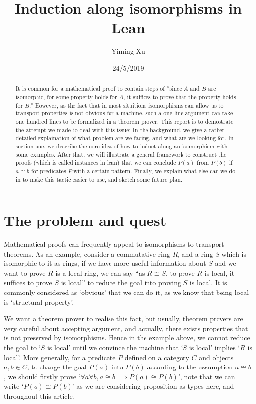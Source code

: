 \documentclass[11pt]{article}
\title{Induction along isomorphisms in Lean}
\author{Yiming Xu}
\date{24/5/2019}
\begin{document}
\maketitle
\begin{abstract}
    It is common for a mathematical proof to contain steps of ``since $A$ and $B$ are isomorphic, for some property holds for $A$, it suffices to prove that the property holds for $B$." However, as the fact that in most situitions isomorphisms can allow us to transport properties is not obvious for a machine, such a one-line argument can take one hundred lines to be formalized in a theorem prover. This report is to demostrate the attempt we made to deal with this issue: In the background, we give a rather detailed explaination of what problem are we facing, and what are we looking for. In section one, we describe the core idea of how to induct along an isomorphism with some examples. After that, we will illustrate a general framework to construct the proofs (which is called instances in lean) that we can conclude $P (a)$ from $P (b)$ if $a \cong b$ for predicates $P$ with a certain pattern. Finally, we explain what else can we do in to make this tactic easier to use, and sketch some future plan.
\end{abstract}
  

\section{The problem and quest}

Mathematical proofs can frequently appeal to isomorphisms to transport theorems. As an example, consider a commutative ring $R$, and a ring $S$ which is isomorphic to it as rings, if we have more useful information about $S$ and we want to prove $R$ is a local ring, we can say ``as $R\cong S$, to prove $R$ is local, it suffices to prove $S$ is local'' to reduce the goal into proving $S$ is local. It is commonly considered as `obvious' that we can do it, as we know that being local is `structural property'. 

We want a theorem prover to realise this fact, but usually, theorem provers are very careful about accepting argument, and actually, there exists properties that is not preserved by isomorphisms. Hence in the example above, we cannot reduce the goal to `$S$ is local' until we convince the machine that `$S$ is local' implies `$R$ is local'. More generally, for a predicate $P$ defined on a category $C$ and objects $a,b\in C$, to change the goal $P(a)$ into $P(b)$ according to the assumption $a\cong b$, we should firstly prove `$\forall a\forall b, a \cong b \implies P(a)\cong P(b)$', note that we can write `$P(a)\cong P(b)$' as we are considering proposition as types here, and throughout this article.
\end{document}
